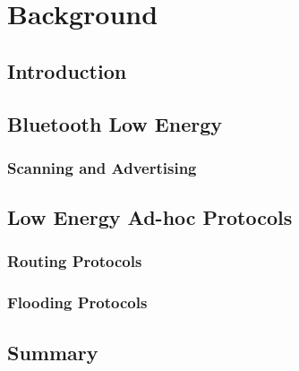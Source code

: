\chapter{Background}

    \section{Introduction}

    \section{Bluetooth Low Energy}
      \subsection{Scanning and Advertising}

    \section{Low Energy Ad-hoc Protocols}
      \subsection{Routing Protocols}
      \subsection{Flooding Protocols}

    \section{Summary}
